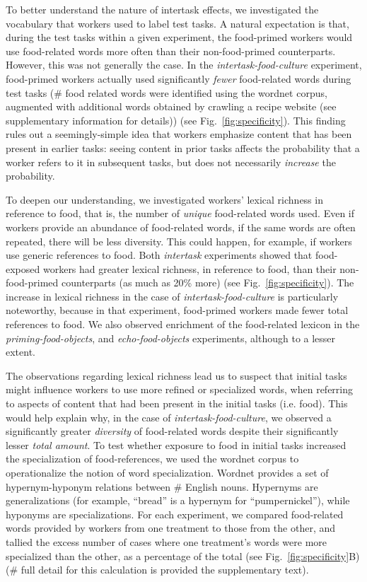 \documentclass[12pt]{article}
\begin{document}
To better understand the nature of 
intertask effects, we investigated the vocabulary
that workers used to label test tasks. A natural expectation is that, during
the test tasks within
a given experiment, the food-primed workers would use food-related words 
more often than their non-food-primed counterparts.  However, this was not 
generally 
the case. In the \textit{intertask-food-culture} experiment, food-primed
workers actually used significantly \textit{fewer} food-related words 
during test tasks
(\# food related words were identified using the wordnet corpus, augmented
with additional words obtained by crawling a recipe website (see supplementary
information for details)) (see Fig.~\ref{fig:specificity}).  This finding
rules out a seemingly-simple idea that workers emphasize
content that has been present in earlier tasks: seeing content in prior tasks
affects the probability that a worker refers to it in subsequent tasks, but 
does not necessarily \textit{increase} the probability.

To deepen our understanding, we investigated workers' lexical richness in 
reference to food, that is, the number of \textit{unique} food-related words
used.  Even if workers provide an abundance of food-related words, if the 
same words are often repeated, there will be less diversity.  
This could happen, for example, if workers use generic references 
to food.
Both \textit{intertask} experiments showed that food-exposed workers had 
greater lexical richness, in reference to food, than their non-food-primed 
counterparts (as much as 20\% more) (see Fig.~\ref{fig:specificity}).  
The increase in lexical richness in the case of 
\textit{intertask-food-culture} is particularly noteworthy, because in that 
experiment, food-primed workers made fewer total references to food.  
We also observed enrichment of the food-related lexicon in the 
\textit{priming-food-objects}, and \textit{echo-food-objects} experiments, 
although to a lesser extent.

The observations regarding lexical richness lead us to suspect that 
initial tasks might influence workers to use more refined or specialized 
words, when referring to aspects of content that had been present in the 
initial tasks (i.e. food).  This would help explain why, in the case of 
\textit{intertask-food-culture}, we observed a significantly greater 
\textit{diversity} of food-related words despite their significantly lesser 
\textit{total amount}.
To test whether exposure to food in initial tasks increased the specialization
of food-references, we used the wordnet corpus to operationalize the 
notion of word specialization.  Wordnet provides a set of hypernym-hyponym 
relations between \# English nouns.  Hypernyms are generalizations 
(for example, ``bread'' is a hypernym for 
``pumpernickel''), while hyponyms are specializations.
For each experiment, we compared food-related words provided by workers from 
one treatment to those from the other, and tallied the excess number of cases
where one treatment's words were more specialized than the other, as a 
percentage of the total (see Fig.~\ref{fig:specificity}B) (\# full detail for 
this calculation is provided the supplementary text). 
\end{document}
